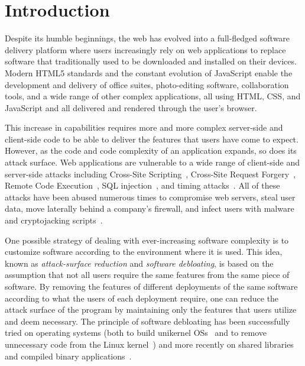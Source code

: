 
\chapter{Introduction\label{ch:intro}}

Despite its humble beginnings, the web has evolved into a full-fledged
software delivery platform where users increasingly rely on web applications
to replace software that traditionally used to be downloaded and installed on
their devices. Modern HTML5 standards and the constant evolution of JavaScript
enable the development and delivery of office suites, photo-editing software,
collaboration tools, and a wide range of other complex applications, all
using HTML, CSS, and JavaScript and all delivered and rendered through the
user's browser.


This increase in capabilities requires more and more complex server-side
and client-side code to be able to deliver the features that users have
come to expect. However, as the code and code complexity of an application
expands, so does its attack surface. Web applications are vulnerable to
a wide range of client-side and server-side attacks including Cross-Site
Scripting~\cite{xss,kirda2006noxes,vogt2007cross}, Cross-Site
Request Forgery~\cite{csrf,jovanovic2006preventing,barth2008csrf},
Remote Code Execution~\cite{rce}, SQL
injection~\cite{sqlInjection,halfond2006classification}, and timing
attacks~\cite{brumley2003timing,vangoethem2015timing}. All of these
attacks have
been abused numerous times to compromise web servers, steal user data,
move laterally behind a company's firewall, and infect users with malware
and cryptojacking scripts~\cite{minesweeper-ccs2018, wang2018seismic,
cryptojacking-ccs2018}.

One possible strategy of dealing with ever-increasing software complexity is to
customize software according to the environment where it is used. This idea,
known as \textit{attack-surface reduction} and \textit{software debloating},
is based on the assumption that not all users require the same features from
the same piece of software. By removing the features of different deployments
of the same software according to what the users of each deployment require,
one can reduce the attack surface of the program by maintaining only the
features that users utilize and deem necessary. The principle of software
debloating has been successfully tried on operating systems (both to build
unikernel OSs~\cite{madhavapeddy2013unikernels} and to remove
unnecessary code from the Linux kernel~\cite{kurmus2013attack,
Kurmus:2011:ASR:1972551.1972557}) and more recently on shared
libraries~\cite{mishra2018shredder,quach2018debloating} and compiled binary
applications~\cite{heo2018effective}.


